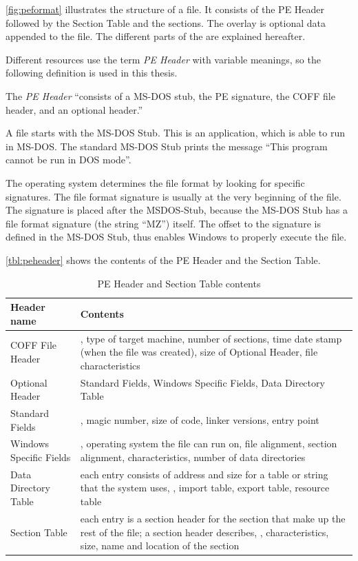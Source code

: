 \autoref{fig:peformat} illustrates the structure of a \PE{} file. It consists of the PE Header followed by the Section Table and the sections. The overlay is optional data appended to the file. The different parts of the \PE{} are explained hereafter. 

Different resources use the term \emph{PE Header} with variable meanings, so the following definition is used in this thesis. 
\begin{definition}[PE Header]
The \emph{PE Header} \enquote{consists of a MS-DOS stub, the PE signature, the COFF file header, and an optional header.} \cite[]{pespec}
\end{definition} 

A \PE{} file starts with the MS-DOS Stub. This is an application, which is able to run in MS-DOS. The standard MS-DOS Stub prints the message \enquote{This program cannot be run in DOS mode}. 

The operating system determines the file format by looking for specific signatures. The file format signature is usually at the very beginning of the file. The \PE{} signature is placed after the MSDOS-Stub, because the MS-DOS Stub has a file format signature (the string \enquote{MZ}) itself. The offset to the \PE{} signature is defined in the MS-DOS Stub, thus enables Windows to properly execute the \PE{} file.

\autoref{tbl:peheader} shows the contents of the PE Header and the Section Table.

\renewcommand{\arraystretch}{1.5}
\begin{table}[h]
	\begin{center}
		\begin{tabular}{p{} p{}}
			\toprule
			Header name			& Contents\\
			\midrule
			COFF File Header	&  \ia{}, type of target machine, number of sections, time date stamp (when the file was created), size of Optional Header, file characteristics\\

		  Optional Header			& Standard Fields, Windows Specific Fields, Data Directory Table\\
      \midrule
      Standard Fields &  \ia{}, magic number, size of code, linker versions, entry point\\
			Windows Specific Fields	& \ia{}, operating system the file can run on, file alignment, section alignment, \DLL{} characteristics, number of data directories\\
			Data Directory Table	& each entry consists of address and size for a table or string that the system uses, \eg{}, import table, export table, resource table\\
			\midrule
      Section Table &  each entry is a section header for the section that make up the rest of the \PE{} file; a section header describes, \ia{}, characteristics, size, name and location of the section\\
			\bottomrule
		\end{tabular}
	\end{center}
	\caption[PE Header contents]{PE Header and Section Table contents}
	\label{tbl:peheader}
\end{table}

